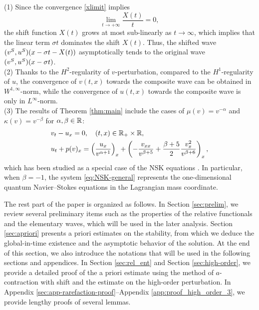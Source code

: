 \documentclass[11pt,reqno]{amsart}
\begin{document}
\begin{remark}
    (1) Since the convergence \eqref{xlimit} implies
    $$
    \lim_{t\rightarrow+\infty}\frac{X(t)}{t}=0,
    $$
    the shift function $X(t)$ grows at most sub-linearly as $t\to\infty$, which implies that the linear term $\sigma t$ dominates the shift $X(t)$. Thus, the shifted wave $(v^S,u^S)(x-\sigma t-X(t))$ asymptotically tends to the original wave $(v^S,u^S)(x-\sigma t)$.\\
    
    \noindent (2) Thanks to the $H^2$-regularity of $v$-perturbation, compared to the $H^1$-regularity of $u$, the convergence of $v(t,x)$ towards the composite wave can be obtained in $W^{1,\infty}$-norm, while the convergence of $u(t,x)$ towards the composite wave is only in $L^\infty$-norm.\\
    
    \noindent (3) The results of Theorem \ref{thm:main} include the cases of $\mu(v)=v^{-\alpha}$ and $\kappa(v)=v^{-\beta}$ for $\alpha, \beta\in\mathbb R$:
    \begin{equation}
    \begin{aligned}\label{eq:NSK-general}
        &v_t-u_x=0,\quad (t,x)\in\mathbb R_+\times\mathbb R,\\
        &u_t +p(v)_x=\left(\frac{u_x}{v^{\alpha+1}}\right)_x+\left(-\frac{v_{xx}}{v^{\beta+5}}+\frac{\beta+5}{2}\frac{v_x^2}{v^{\beta+6}}\right)_x,
    \end{aligned}
    \end{equation}
	which has been studied as a special case of the NSK equations \cite{CCDZ}. In particular, when $\beta=-1$, the system \eqref{eq:NSK-general} represents the one-dimensional quantum Navier--Stokes equations in the Lagrangian mass coordinate. 
\end{remark}

The rest part of the paper is organized as follows. In Section \ref{sec:prelim}, we review several preliminary items such as the properties of the relative functionals and the elementary waves, which will be used in the later analysis. Section \ref{sec:apriori} presents a priori estimates on the stability, from which we deduce the global-in-time existence and the asymptotic behavior of the solution. At the end of this section, we also introduce the notations that will be used in the following sections and appendices. In Section \ref{sec:rel_ent} and Section \ref{sec:high-order}, we provide a detailed proof of the a priori estimate using the method of $a$-contraction with shift and the estimate on the high-order perturbation. In Appendix \ref{sec:app-rarefaction-proof}--Appendix \ref{app:proof_high_order_3}, we provide lengthy proofs of several lemmas.
\end{document}
